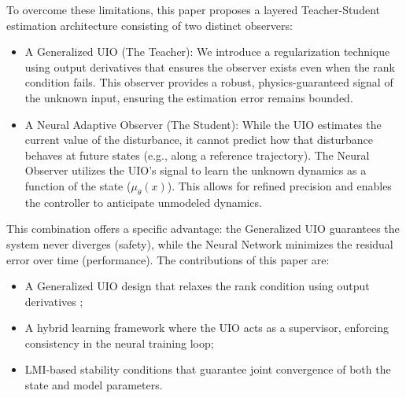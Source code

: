 \documentclass{ifacconf}
\begin{document}
To overcome these limitations, this paper proposes a layered Teacher-Student estimation architecture consisting of two distinct observers:
\begin{itemize}
    \item  A Generalized UIO (The Teacher): We introduce a regularization technique using output derivatives that ensures the observer exists even when the rank condition fails. This observer provides a robust, physics-guaranteed signal of the unknown input, ensuring the estimation error remains bounded. 
    \item A Neural Adaptive Observer (The Student): While the UIO estimates the current value of the disturbance, it cannot predict how that disturbance behaves at future states (e.g., along a reference trajectory). The Neural Observer utilizes the UIO's signal to learn the unknown dynamics as a function of the state ($\mu_\theta(x)$). This allows for refined precision and enables the controller to anticipate unmodeled dynamics.
\end{itemize}
This combination offers a specific advantage: the Generalized UIO guarantees the system never diverges (safety), while the Neural Network minimizes the residual error over time (performance). The contributions of this paper are:
\begin{itemize}
    \item A Generalized UIO design that relaxes the rank condition using output derivatives ;
    \item A hybrid learning framework where the UIO acts as a supervisor, enforcing consistency in the neural training loop; 
    \item LMI-based stability conditions that guarantee joint convergence of both the state and model parameters. 
\end{itemize}






\end{document}
